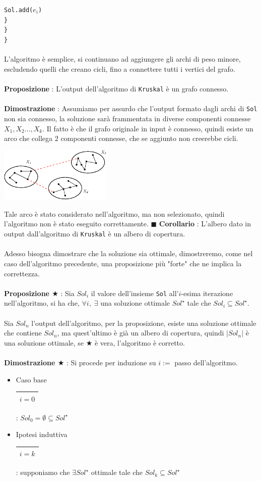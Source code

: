 \documentclass[12pt, letterpaper]{article}
\newcommand{\codee}[1]{\colorbox{white}{\texttt{#1}}}
\newcommand{\acc}{\\\hphantom{}\\}
\newcommand{\boxedMath}[1]{\begin{tabular}{|c|}\hline \texttt{#1} \\ \hline\end{tabular} :}
\begin{document}
\hphantom{ident}\hphantom{ident}\hphantom{ident}\codee{Sol.add($e_i$)}\\
\hphantom{ident}\hphantom{ident}\codee{\}}\\
\hphantom{ident}\codee{\}}\\
\codee{\}}\acc 
L'algoritmo è semplice, si continuano ad aggiungere gli archi di peso minore, escludendo quelli che creano cicli, fino 
a connettere tutti i vertici del grafo.\acc 
\textbf{Proposizione} : L'output dell'algoritmo di \codee{Kruskal} è un grafo connesso.\acc 
\textbf{Dimostrazione} : Assumiamo per assurdo che l'output formato dagli archi di \codee{Sol} non sia connesso, 
la soluzione sarà frammentata in diverse componenti connesse $X_1,X_2\dots,X_k$. Il fatto è che il grafo originale in input è connesso, quindi 
esiste un arco che collega 2 componenti connesse, che se aggiunto non creerebbe cicli.
\begin{center}
    \includegraphics[width=0.4\textwidth ]{images/propMST.eps}
\end{center}
 Tale arco è stato considerato nell'algoritmo, 
ma non selezionato, quindi l'algoritmo non è stato eseguito correttamente. $\blacksquare$
\textbf{Corollario} : L'albero dato in output dall'algoritmo di  \codee{Kruskal} è un albero di copertura.\acc 
Adesso bisogna dimostrare che la soluzione sia ottimale, dimostreremo, come nel caso dell'algoritmo precedente, una proposizione 
più "forte" che ne implica la correttezza.\acc 
\textbf{Proposizione $\bigstar$} : Sia $Sol_i$ il valore dell'insieme \codee{Sol} all'$i$-esima iterazione nell'algoritmo, 
si ha che, $\forall i,\; \exists $ una soluzione ottimale $Sol^\star$ tale che $Sol_i\subseteq Sol^\star$.\acc 
Sia $Sol_n$ l'output dell'algoritmo, per la proposizione, esiste una soluzione ottimale che contiene $Sol_n$, ma quest'ultimo 
è già un albero di copertura, quindi $|Sol_n|$ è una soluzione ottimale, se $\bigstar$ è vera, l'algoritmo è corretto.\acc 
\textbf{Dimostrazione $\bigstar$} :  Si procede per induzione su $i :=$ passo dell'algoritmo.\begin{itemize}
    \item Caso base \boxedMath{$i=0$} $Sol_0 = \emptyset \subseteq Sol^\star$ 
    \item Ipotesi induttiva  \boxedMath{$i=k$} supponiamo che $\exists Sol^\star$ ottimale tale che $Sol_k\subseteq Sol^\star$
\end{itemize}
\end{document}
